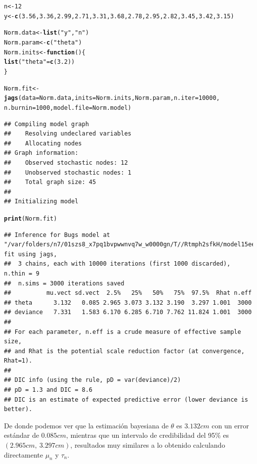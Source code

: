 \documentclass[10pt,openright]{book}\usepackage[]{graphicx}\usepackage[]{color}
\makeatletter
\newcommand{\hlnum}[1]{\textcolor[rgb]{0.686,0.059,0.569}{#1}}%
\newcommand{\hlstr}[1]{\textcolor[rgb]{0.192,0.494,0.8}{#1}}%
\newcommand{\hlstd}[1]{\textcolor[rgb]{0.345,0.345,0.345}{#1}}%
\newcommand{\hlkwa}[1]{\textcolor[rgb]{0.161,0.373,0.58}{\textbf{#1}}}%
\newcommand{\hlkwb}[1]{\textcolor[rgb]{0.69,0.353,0.396}{#1}}%
\newcommand{\hlkwc}[1]{\textcolor[rgb]{0.333,0.667,0.333}{#1}}%
\newcommand{\hlkwd}[1]{\textcolor[rgb]{0.737,0.353,0.396}{\textbf{#1}}}%
\newenvironment{kframe}{%
 \def\at@end@of@kframe{}%
 \ifinner\ifhmode%
  \def\at@end@of@kframe{\end{minipage}}%
  \begin{minipage}{\columnwidth}%
 \fi\fi%
 \def\FrameCommand##1{\hskip\@totalleftmargin \hskip-\fboxsep
 \colorbox{shadecolor}{##1}\hskip-\fboxsep
     \hskip-\linewidth \hskip-\@totalleftmargin \hskip\columnwidth}%
 \MakeFramed {\advance\hsize-\width
   \@totalleftmargin\z@ \linewidth\hsize
   \@setminipage}}%
 {\par\unskip\endMakeFramed%
 \at@end@of@kframe}
\newenvironment{knitrout}{}{} %
\makeatother
\begin{document}
\begin{Eje}
\begin{knitrout}
\begin{kframe}
\begin{alltt}
\hlstd{n} \hlkwb{<-} \hlnum{12}
\hlstd{y} \hlkwb{<-} \hlkwd{c}\hlstd{(}\hlnum{3.56}\hlstd{,} \hlnum{3.36}\hlstd{,} \hlnum{2.99}\hlstd{,} \hlnum{2.71}\hlstd{,} \hlnum{3.31}\hlstd{,} \hlnum{3.68}\hlstd{,} \hlnum{2.78}\hlstd{,} \hlnum{2.95}\hlstd{,} \hlnum{2.82}\hlstd{,} \hlnum{3.45}\hlstd{,} \hlnum{3.42}\hlstd{,} \hlnum{3.15}\hlstd{)}

\hlstd{Norm.data} \hlkwb{<-} \hlkwd{list}\hlstd{(}\hlstr{"y"}\hlstd{,}\hlstr{"n"}\hlstd{)}
\hlstd{Norm.param} \hlkwb{<-} \hlkwd{c}\hlstd{(}\hlstr{"theta"}\hlstd{)}
\hlstd{Norm.inits} \hlkwb{<-} \hlkwa{function}\hlstd{()\{}
\hlkwd{list}\hlstd{(}\hlstr{"theta"}\hlstd{=}\hlkwd{c}\hlstd{(}\hlnum{3.2}\hlstd{))}
\hlstd{\}}

\hlstd{Norm.fit} \hlkwb{<-} \hlkwd{jags}\hlstd{(}\hlkwc{data}\hlstd{=Norm.data,} \hlkwc{inits}\hlstd{=Norm.inits, Norm.param,} \hlkwc{n.iter}\hlstd{=}\hlnum{10000}\hlstd{,}
\hlkwc{n.burnin}\hlstd{=}\hlnum{1000}\hlstd{,} \hlkwc{model.file}\hlstd{=Norm.model)}
\end{alltt}


{\ttfamily\noindent\itshape\color{messagecolor}{\#\# module glm loaded}}\begin{verbatim}
## Compiling model graph
##    Resolving undeclared variables
##    Allocating nodes
## Graph information:
##    Observed stochastic nodes: 12
##    Unobserved stochastic nodes: 1
##    Total graph size: 45
## 
## Initializing model
\end{verbatim}
\begin{alltt}
\hlkwd{print}\hlstd{(Norm.fit)}
\end{alltt}
\begin{verbatim}
## Inference for Bugs model at "/var/folders/n7/01szs8_x7pq1bvpwwnvq7w_w0000gn/T//Rtmph2sfkH/model15eea40f4d8d4.txt", fit using jags,
##  3 chains, each with 10000 iterations (first 1000 discarded), n.thin = 9
##  n.sims = 3000 iterations saved
##          mu.vect sd.vect  2.5%   25%   50%   75%  97.5%  Rhat n.eff
## theta      3.132   0.085 2.965 3.073 3.132 3.190  3.297 1.001  3000
## deviance   7.331   1.583 6.170 6.285 6.710 7.762 11.824 1.001  3000
## 
## For each parameter, n.eff is a crude measure of effective sample size,
## and Rhat is the potential scale reduction factor (at convergence, Rhat=1).
## 
## DIC info (using the rule, pD = var(deviance)/2)
## pD = 1.3 and DIC = 8.6
## DIC is an estimate of expected predictive error (lower deviance is better).
\end{verbatim}
\end{kframe}
\end{knitrout}
    De donde podemos ver que la estimaci\'on bayesiana de $\theta$ es $3.132cm$ con un error est\'andar de $0.085cm$, mientras que un intervalo de credibilidad del 95\% es $(2.965cm,\ 3.297cm)$, resultados muy similares a lo obtenido calculando directamente $\mu_n$ y $\tau_n$.
    

\end{Eje}
\end{document}

